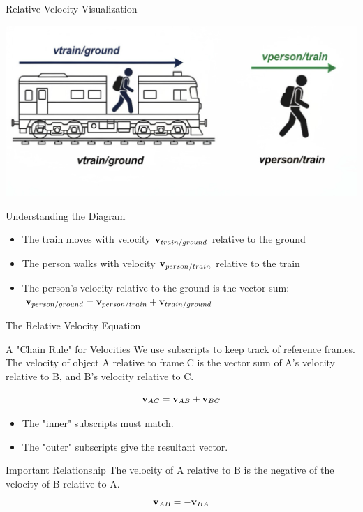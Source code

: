\documentclass{beamer}
\begin{document}
\begin{frame}{Relative Velocity Visualization}
    \begin{center}
    \includegraphics[width=0.8\linewidth]{phys12-relative-velocity-train.png}
    \end{center}
    
    \begin{block}{Understanding the Diagram}
        \begin{itemize}
            \item The train moves with velocity $\vb{v}_{train/ground}$ relative to the ground
            \item The person walks with velocity $\vb{v}_{person/train}$ relative to the train
            \item The person's velocity relative to the ground is the vector sum: $\vb{v}_{person/ground} = \vb{v}_{person/train} + \vb{v}_{train/ground}$
        \end{itemize}
    \end{block}
\end{frame}

\begin{frame}{The Relative Velocity Equation}
    \begin{block}{A "Chain Rule" for Velocities}
        We use subscripts to keep track of reference frames. The velocity of object A relative to frame C is the vector sum of A's velocity relative to B, and B's velocity relative to C.
        
        \Large{\[ \vb{v}_{AC} = \vb{v}_{AB} + \vb{v}_{BC} \]}
        
        \begin{itemize}
            \item The "inner" subscripts must match.
            \item The "outer" subscripts give the resultant vector.
        \end{itemize}
    \end{block}
    
    \begin{alertblock}{Important Relationship}
        The velocity of A relative to B is the negative of the velocity of B relative to A.
        \[ \vb{v}_{AB} = - \vb{v}_{BA} \]
    \end{alertblock}
\end{frame}
\end{document}

